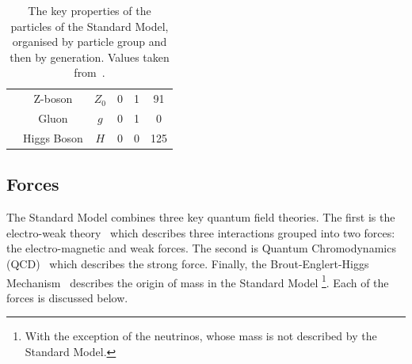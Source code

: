 {\begin{table}[!ht]
\begin{center}
\begin{tabular}{|c|c||c|c|c|c|}
                            &Z-boson          &   $Z_0$       &  0      &  1     &  91\\
                            &Gluon            &   $g$         &  0      &  1     &  0 \\
                            &Higgs Boson      &   $H$         &  0      &  0     &  125\\
    \hline  
    \end{tabular} 
  \caption[The key properties of the particles of the Standard Model]
          {The key properties of the particles of the Standard Model, organised by particle group and then by generation.
            Values taken from~\cite{obj-bjets_PDG}.}
  \label{tab:theo-sm_particles}
  \end{center}
  \end{table}}

  \newpage
\subsection{Forces}
\label{sec:theo-sm_forces}

The Standard Model combines three key quantum field theories.
The first is the electro-weak theory~\cite{theo-glashow}
which describes three interactions grouped into two forces: the electro-magnetic and weak forces.
The second is Quantum Chromodynamics (QCD)~\cite{theo-qcd} which describes the strong force.
Finally, the Brout-Englert-Higgs Mechanism~\cite{theo-be,theo-higgs} describes the origin of mass in the Standard Model
\footnote{With the exception of the neutrinos, whose mass is not described by the Standard Model.}.
Each of the forces is discussed below.

